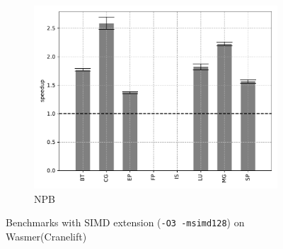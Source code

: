 \begin{figure}
\begin{subfigure}[t]{.45\textwidth}
        \includegraphics[width=\textwidth]
        {Images/6.1.RQ1/npb-wasmer-cranelift-simd.pdf}
        \caption{NPB}
    \end{subfigure}
    \caption{Benchmarks with SIMD extension (\texttt{-O3 -msimd128})
        on Wasmer(Cranelift)}
    \label{fig:rq1-wasmer-cranelift-simd}
\end{figure}

